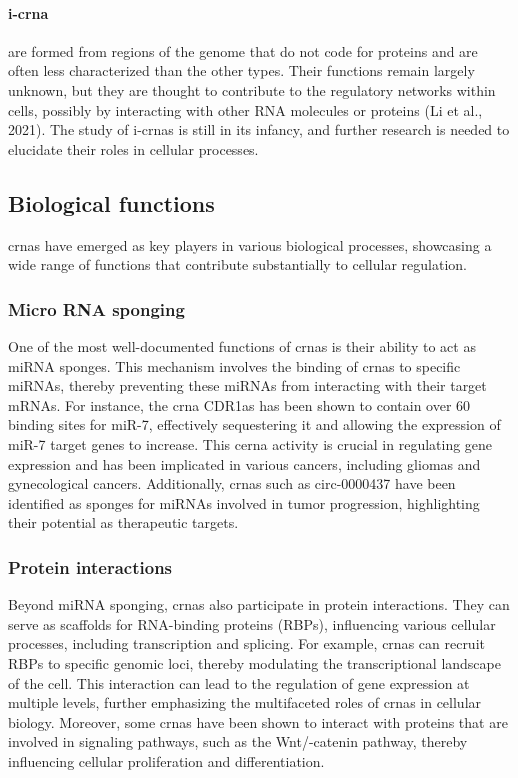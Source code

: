 \paragraph{\gls{i-crna}} are formed from regions of
the
genome
that do not code for proteins and are often less characterized than the other
types.
Their functions remain largely unknown, but they are thought to contribute to
the regulatory networks within cells, possibly by interacting with other RNA
molecules or proteins (Li et al., 2021).
The study of \gls{i-crna}s is still in its infancy, and further research is
needed to elucidate their roles in cellular processes.

\subsection{Biological functions}
\label{sec:circrna_functions}
\gls{crna}s have emerged as key players in various biological processes,
showcasing
a wide range of functions that contribute substantially to cellular regulation.

\subsubsection{Micro RNA sponging}
One of the most well-documented functions of \gls{crna}s is their ability to
act as miRNA sponges.
This mechanism involves the binding of \gls{crna}s to specific miRNAs, thereby
preventing these miRNAs from interacting with their target mRNAs.
For instance, the \gls{crna} CDR1as has been shown to contain over 60 binding
sites for miR-7, effectively sequestering it and allowing the expression of
miR-7 target genes to
increase\supercite{guo_expanded_2014,yuan_regulatory_2020}.
This \gls{cerna} activity is crucial in regulating gene
expression and has been implicated in various cancers, including gliomas and
gynecological cancers\supercite{dong_expression_2020,song_circular_2016}.
Additionally, \gls{crna}s such as circ-0000437 have been identified as sponges
for miRNAs involved in tumor progression, highlighting their potential as
therapeutic targets\supercite{li_peptide_2021,cui_circular_2022}.

\subsubsection{Protein interactions}
Beyond miRNA sponging, \gls{crna}s also participate in protein interactions.
They can serve as scaffolds for RNA-binding proteins (RBPs), influencing
various cellular processes, including transcription and
splicing\supercite{li_comprehensive_2017,qu_emerging_2017}.
For example, \gls{crna}s can recruit RBPs to specific genomic loci, thereby
modulating the transcriptional landscape of the
cell\supercite{li_comprehensive_2017}.
This interaction can lead to the regulation of gene expression at multiple
levels, further emphasizing the multifaceted roles of \gls{crna}s in cellular
biology\supercite{zhang_important_2024,he_targeting_2021}.
Moreover, some \gls{crna}s have been shown to interact with proteins that are
involved in signaling pathways, such as the Wnt/\textbeta{}-catenin pathway,
thereby influencing cellular proliferation and
differentiation\supercite{peng_novel_2021}.

